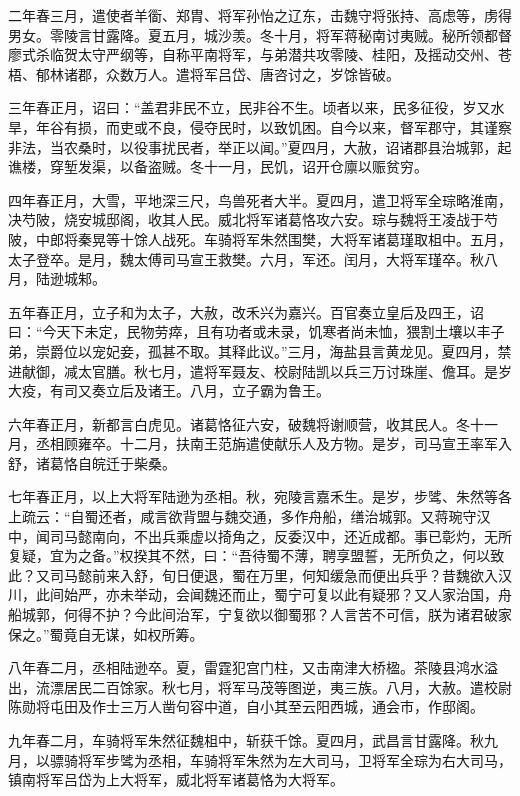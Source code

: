\documentclass[12pt,UTF8]{ctexbook}
\begin{document}
二年春三月，遣使者羊衟、郑胄、将军孙怡之辽东，击魏守将张持、高虑等，虏得男女。零陵言甘露降。夏五月，城沙羡。冬十月，将军蒋秘南讨夷贼。秘所领都督廖式杀临贺太守严纲等，自称平南将军，与弟潜共攻零陵、桂阳，及摇动交州、苍梧、郁林诸郡，众数万人。遣将军吕岱、唐咨讨之，岁馀皆破。

三年春正月，诏曰：“盖君非民不立，民非谷不生。顷者以来，民多征役，岁又水旱，年谷有损，而吏或不良，侵夺民时，以致饥困。自今以来，督军郡守，其谨察非法，当农桑时，以役事扰民者，举正以闻。”夏四月，大赦，诏诸郡县治城郭，起谯楼，穿堑发渠，以备盗贼。冬十一月，民饥，诏开仓廪以赈贫穷。

四年春正月，大雪，平地深三尺，鸟兽死者大半。夏四月，遣卫将军全琮略淮南，决芍陂，烧安城邸阁，收其人民。威北将军诸葛恪攻六安。琮与魏将王凌战于芍陂，中郎将秦晃等十馀人战死。车骑将军朱然围樊，大将军诸葛瑾取柤中。五月，太子登卒。是月，魏太傅司马宣王救樊。六月，军还。闰月，大将军瑾卒。秋八月，陆逊城邾。

五年春正月，立子和为太子，大赦，改禾兴为嘉兴。百官奏立皇后及四王，诏曰：“今天下未定，民物劳瘁，且有功者或未录，饥寒者尚未恤，猥割土壤以丰子弟，崇爵位以宠妃妾，孤甚不取。其释此议。”三月，海盐县言黄龙见。夏四月，禁进献御，减太官膳。秋七月，遣将军聂友、校尉陆凯以兵三万讨珠崖、儋耳。是岁大疫，有司又奏立后及诸王。八月，立子霸为鲁王。

六年春正月，新都言白虎见。诸葛恪征六安，破魏将谢顺营，收其民人。冬十一月，丞相顾雍卒。十二月，扶南王范旃遣使献乐人及方物。是岁，司马宣王率军入舒，诸葛恪自皖迁于柴桑。

七年春正月，以上大将军陆逊为丞相。秋，宛陵言嘉禾生。是岁，步骘、朱然等各上疏云：“自蜀还者，咸言欲背盟与魏交通，多作舟船，缮治城郭。又蒋琬守汉中，闻司马懿南向，不出兵乘虚以掎角之，反委汉中，还近成都。事已彰灼，无所复疑，宜为之备。”权揆其不然，曰：“吾待蜀不薄，聘享盟誓，无所负之，何以致此？又司马懿前来入舒，旬日便退，蜀在万里，何知缓急而便出兵乎？昔魏欲入汉川，此间始严，亦未举动，会闻魏还而止，蜀宁可复以此有疑邪？又人家治国，舟船城郭，何得不护？今此间治军，宁复欲以御蜀邪？人言苦不可信，朕为诸君破家保之。”蜀竟自无谋，如权所筹。

八年春二月，丞相陆逊卒。夏，雷霆犯宫门柱，又击南津大桥楹。茶陵县鸿水溢出，流漂居民二百馀家。秋七月，将军马茂等图逆，夷三族。八月，大赦。遣校尉陈勋将屯田及作士三万人凿句容中道，自小其至云阳西城，通会市，作邸阁。

九年春二月，车骑将军朱然征魏柤中，斩获千馀。夏四月，武昌言甘露降。秋九月，以骠骑将军步骘为丞相，车骑将军朱然为左大司马，卫将军全琮为右大司马，镇南将军吕岱为上大将军，威北将军诸葛恪为大将军。
\end{document}
